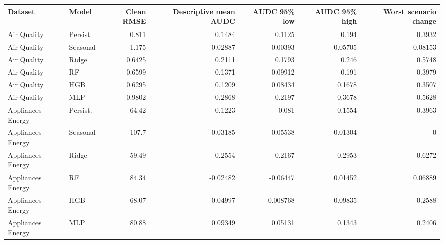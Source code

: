 \begin{tabular}{llrrrrr}
\toprule
Dataset & Model & Clean RMSE & Descriptive mean AUDC & AUDC 95\% low & AUDC 95\% high & Worst scenario change \\
\midrule
Air Quality & Persist. & 0.811 & 0.1484 & 0.1125 & 0.194 & 0.3932 \\
Air Quality & Seasonal & 1.175 & 0.02887 & 0.00393 & 0.05705 & 0.08153 \\
Air Quality & Ridge & 0.6425 & 0.2111 & 0.1793 & 0.246 & 0.5748 \\
Air Quality & RF & 0.6599 & 0.1371 & 0.09912 & 0.191 & 0.3979 \\
Air Quality & HGB & 0.6295 & 0.1209 & 0.08434 & 0.1678 & 0.3507 \\
Air Quality & MLP & 0.9802 & 0.2868 & 0.2197 & 0.3678 & 0.5628 \\
Appliances Energy & Persist. & 64.42 & 0.1223 & 0.081 & 0.1554 & 0.3963 \\
Appliances Energy & Seasonal & 107.7 & -0.03185 & -0.05538 & -0.01304 & 0 \\
Appliances Energy & Ridge & 59.49 & 0.2554 & 0.2167 & 0.2953 & 0.6272 \\
Appliances Energy & RF & 84.34 & -0.02482 & -0.06447 & 0.01452 & 0.06889 \\
Appliances Energy & HGB & 68.07 & 0.04997 & -0.008768 & 0.09835 & 0.2588 \\
Appliances Energy & MLP & 80.88 & 0.09349 & 0.05131 & 0.1343 & 0.2406 \\
\bottomrule
\end{tabular}
